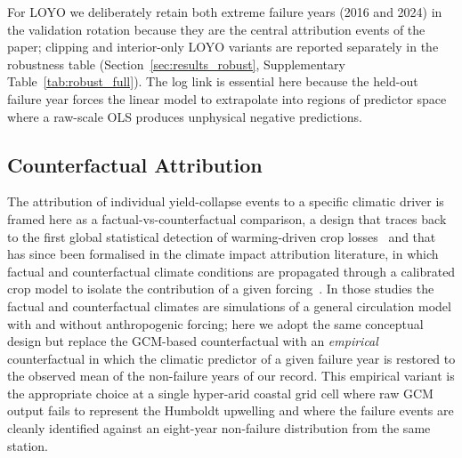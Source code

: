 \documentclass[agronomy,article,submit,pdftex,moreauthors]{Definitions/mdpi}
\begin{document}
For LOYO we deliberately retain both extreme failure years (2016 and 2024) in the validation rotation because they are the central attribution events of the paper; clipping and interior-only LOYO variants are reported separately in the robustness table (Section~\ref{sec:results_robust}, Supplementary Table~\ref{tab:robust_full}). The log link is essential here because the held-out failure year forces the linear model to extrapolate into regions of predictor space where a raw-scale OLS produces unphysical negative predictions.

\subsection{Counterfactual Attribution}
\label{sec:counterfactual_method}

The attribution of individual yield-collapse events to a specific climatic driver is framed here as a factual-vs-counterfactual comparison, a design that traces back to the first global statistical detection of warming-driven crop losses~\cite{lobell2007} and that has since been formalised in the climate impact attribution literature, in which factual and counterfactual climate conditions are propagated through a calibrated crop model to isolate the contribution of a given forcing~\cite{iizumi2018,sultan2019,karunaratne2025}. In those studies the factual and counterfactual climates are simulations of a general circulation model with and without anthropogenic forcing; here we adopt the same conceptual design but replace the GCM-based counterfactual with an \emph{empirical} counterfactual in which the climatic predictor of a given failure year is restored to the observed mean of the non-failure years of our record. This empirical variant is the appropriate choice at a single hyper-arid coastal grid cell where raw GCM output fails to represent the Humboldt upwelling and where the failure events are cleanly identified against an eight-year non-failure distribution from the same station.
\end{document}
